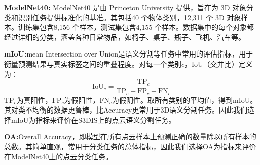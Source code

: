 \documentclass[preprint,12pt]{elsarticle}
\begin{document}
\textbf{ModelNet40:}
ModelNet40 是由 Princeton University 提供，旨在为 3D 对象分类和识别任务提供标准化的基准。其包括40 个物体类别，12,311 个 3D 对象样本。训练集包含8,156 个样本，测试集包含4,155 个样本。数据集中的每个对象都经过详细的分类，涵盖各种日常物品，如椅子、桌子、瓶子、飞机、汽车等。


\textbf{mIoU:}mean Intersection over Union是语义分割等任务中常用的评估指标，用于衡量预测结果与真实标签之间的重叠程度。对每一个类别$c$，IoU（交并比）定义为：\begin{equation}\mathrm{IoU}_c=\frac{\mathrm{TP}_c}{\mathrm{TP}_c+\mathrm{FP}_c+\mathrm{FN}_c}\end{equation}
$\mathrm{TP}_{c}$为真阳性，$\mathrm{FP}_{c}$为假阳性，$\mathrm{FN}_{c}$为假阴性。取所有类别的平均值，得到mIoU。其对类不均衡的数据更鲁棒，比Accuracy更常用于3D语义分割任务。因此我们选择mIoU为指标来评价在S3DIS上的点云语义分割任务。

\textbf{OA:}Overall Accuracy，即模型在所有点云样本上预测正确的数量除以所有样本的总数。其简单直观，常用于分类任务的总体指标，因此我们选择OA为指标来评价在ModelNet40上的点云分类任务。
\end{document}
